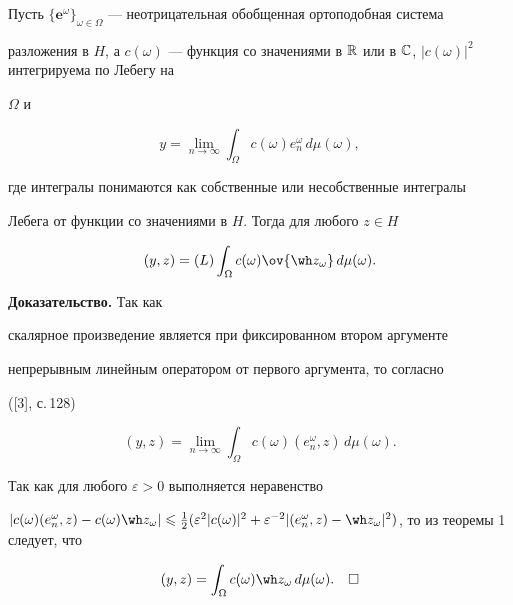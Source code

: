 \begin{thm}\hspace{-1.8mm}{\bf.}


Пусть $\{\boldsymbol e^\omega\}_{\omega\in


\Omega}$ --- неотрицательная обобщенная ортоподобная система


разложения в $H$, а $c(\omega)$ --- функция со значениями в $\Bbb


R$ или в $\Bbb C$, $|c(\omega)|^2$ интегрируема по Лебегу на


$\Omega$ и


$$


y=\lim_{n\to\infty}\int_\Omega c(\omega)e^\omega_n\,d\mu(\omega),


$$


где интегралы понимаются как собственные или несобственные интегралы


Лебега от функции со значениями в $H$. Тогда для любого $z\in H$


$$


(y,z)=(L)\int_\Omega c(\omega)\ov{\wh z_\omega}\,


d\mu(\omega).


$$


\end{thm}





{\bf Доказательство.} Так как


скалярное произведение является при фиксированном втором аргументе


непрерывным линейным оператором от первого аргумента, то согласно


([3], с.\,128)


$$


(y,z)=\lim_{n\to\infty}\int_\Omega c(\omega)(e^\omega_n,z)\,


d\mu(\omega).


$$


Так как для любого $\varepsilon>0$ выполняется неравенство


$|c(\omega)(e^\omega_n,z)-c(\omega)\wh z_\omega|\leqslant


\frac12(\varepsilon^2|c(\omega)|^2+\varepsilon^{-2}|(e^\omega_n


,z)-\wh z_\omega|^2)$, то из теоремы 1 следует, что


$$


(y,z)=\int_\Omega c(\omega)\wh z_\omega\,d\mu(\omega).\quad\square


$$





